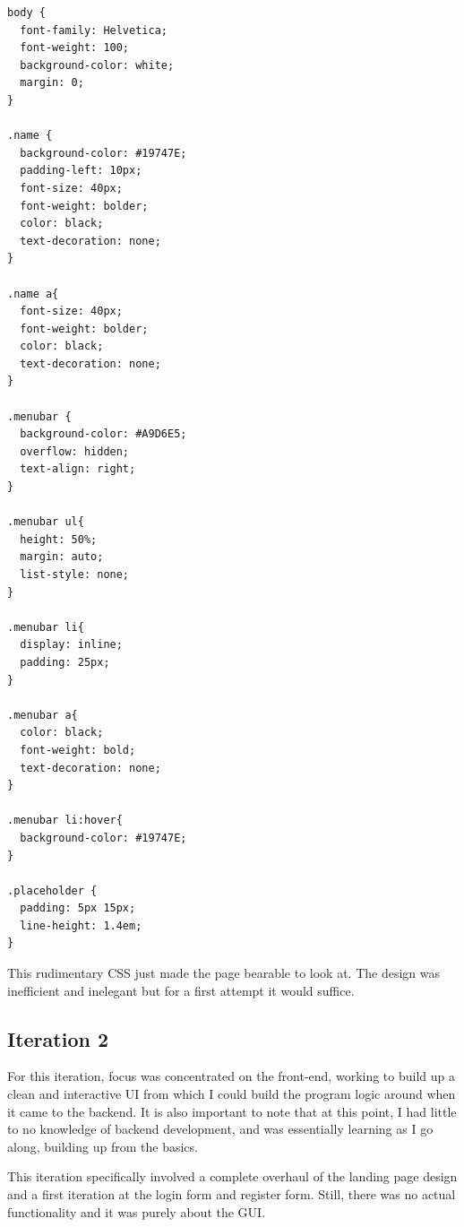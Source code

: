 \documentclass{article}
\begin{document}
\begin{lstlisting}[caption={style.css}]
  body {
  font-family: Helvetica;
  font-weight: 100;
  background-color: white;
  margin: 0;
}

.name {
  background-color: #19747E;
  padding-left: 10px;
  font-size: 40px;
  font-weight: bolder;
  color: black;
  text-decoration: none;
}

.name a{
  font-size: 40px;
  font-weight: bolder;
  color: black;
  text-decoration: none;
}

.menubar {
  background-color: #A9D6E5;
  overflow: hidden;
  text-align: right;
}

.menubar ul{
  height: 50%;
  margin: auto;
  list-style: none;
}

.menubar li{
  display: inline;
  padding: 25px;
}

.menubar a{
  color: black;
  font-weight: bold;
  text-decoration: none;
}

.menubar li:hover{
  background-color: #19747E;
}

.placeholder {
  padding: 5px 15px;
  line-height: 1.4em;
}
\end{lstlisting}

This rudimentary CSS just made the page bearable to look at. The design was inefficient and inelegant but for a first attempt it would suffice. 

\subsection{Iteration 2}

For this iteration, focus was concentrated on the front-end, working to build up a clean and interactive UI from which I could build the program logic around when it came to the backend. It is also important to note that at this point, I had little to no knowledge of backend development, and was essentially learning as I go along, building up from the basics.

This iteration specifically involved a complete overhaul of the landing page design and a first iteration at the login form and register form. Still, there was no actual functionality and it was purely about the GUI. 
\end{document}
